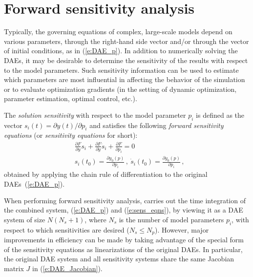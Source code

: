 \section{Forward sensitivity analysis}\label{ss:fwd_sensi}

Typically, the governing equations of complex, large-scale models
depend on various parameters,  through the right-hand side vector
and/or through the vector of initial conditions, as in (\ref{e:DAE_p}).
In addition to numerically solving the DAEs, it may be desirable to
determine the sensitivity of the results with respect to the model
parameters.
Such sensitivity information can be used to estimate which
parameters are most influential in affecting the behavior of the
simulation or to evaluate optimization gradients (in the setting of dynamic
optimization, parameter estimation, optimal control, etc.).

The {\em solution sensitivity} with respect to the model parameter
$p_i$ is defined as the vector
$s_i (t) = {\partial y(t)}/{\partial p_i}$
and satisfies the following {\em forward sensitivity equations}
(or {\em sensitivity equations} for short):
\begin{equation}\label{e:sens_eqns}
\begin{split}
& \frac{\partial F}{\partial y} s_i + \frac{\partial F}{\partial \dot y} {\dot s_i} + \frac{\partial F}{\partial p_i} = 0\\
& s_i(t_0) = \frac{\partial y_{0}(p)}{\partial p_i} \, ,~ \dot s_i(t_0) =  \frac{\partial \dot y_{0}(p)}{\partial p_i} \, ,
\end{split}
\end{equation}
obtained by applying the chain rule of differentiation to the original DAEs~(\ref{e:DAE_p}).


When performing forward sensitivity analysis, {\idas} carries out
the time integration of the combined system, (\ref{e:DAE_p}) and
(\ref{e:sens_eqns}), by viewing it as a DAE system of size
$N(N_s+1)$, where $N_s$ is the number of model parameters $p_i$, with
respect to which sensitivities are desired ($N_s \le N_p$).
However, major improvements in efficiency can be made by taking
advantage of the special form of the sensitivity equations as
linearizations of the original DAEs.  In particular, the original
DAE system and all sensitivity systems share the same Jacobian matrix
$J$ in (\ref{e:DAE_Jacobian}).

